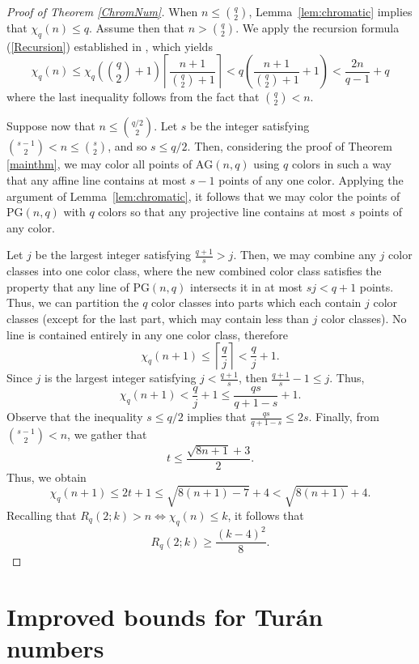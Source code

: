 \documentclass[12pt]{article}
\newcommand{\PG}{\text{PG}}
\newcommand{\AG}{\text{AG}}
\begin{document}
\begin{proof}[Proof of Theorem \ref{ChromNum}]
When $n \leq \binom{q}{2}$, Lemma~\ref{lem:chromatic} implies that $\chi_q(n) \leq q$. Assume then that $n > \binom{q}{2}$. We apply the recursion formula (\ref{Recursion}) established in \cite{BishnoiCamesRavi2025}, which yields
$$
\chi_q(n) \leq \chi_q\left(\binom{q}{2} + 1\right)\left \lceil \frac{n+1}{\binom{q}{2} + 1} \right\rceil < q\left( \frac{n+1}{\binom{q}{2} + 1}  + 1\right) < \frac{2n}{q-1} + q
$$
where the last inequality follows from the fact that $\binom{q}{2} < n$.

Suppose now that $n \leq \binom{q/2}{2}$. Let $s$ be the integer satisfying $\binom{s-1}{2}< n \leq \binom{s}{2}$, and so $s \leq q/2$. Then, considering the proof of Theorem \ref{mainthm}, we may color all points of $\AG(n, q)$ using $q$ colors in such a way that any affine line contains at most $s-1$ points of any one color.
Applying the argument of Lemma~\ref{lem:chromatic}, it follows that we may color the points of $\PG(n,q)$ with $q$ colors so that any projective line contains at most $s$ points of any color.

 Let $j$ be the largest integer satisfying $\frac{q + 1}{s} > j$. Then, we may combine any $j$ color classes into one color class, where the new combined color class satisfies the property that any line of $\PG(n, q)$ intersects it in at most $sj < q+1$ points. Thus, we can partition the $q$ color classes into parts which each contain $j$ color classes (except for the last part, which may contain less than $j$ color classes). No line is contained entirely in any one color class, therefore
 $$
 \chi_q(n + 1) \leq \left \lceil \frac{q}{j} \right\rceil < \frac{q}{j} + 1.
 $$
 Since $j$ is the largest integer satisfying $j < \frac{q + 1}{s}$, then $\frac{q + 1}{s} - 1 \leq j$. Thus,
 $$
 \chi_q(n + 1) < \frac{q}{j} + 1 \leq \frac{qs}{q + 1 - s}+1.
 $$
 Observe that the inequality $s \leq q/2$ implies that $\frac{qs}{q+1 - s} \leq 2s$. Finally, from $\binom{s-1}{2} < n$, we gather that 
 $$
 t \leq \frac{\sqrt{8n + 1} + 3}{2}.
 $$
 Thus, we obtain
 $$
 \chi_q(n+1) \leq 2t + 1 \leq \sqrt{8(n + 1) - 7} + 4 < \sqrt{8(n + 1)} + 4.
 $$
 Recalling that $R_q(2;k) > n \iff   \chi_q(n) \leq k$, it follows that 
 $$
 R_q(2; k) \geq \frac{(k-4)^2}{8}.
 $$
\end{proof}


\section{Improved bounds for Tur\'{a}n numbers}
\end{document}
